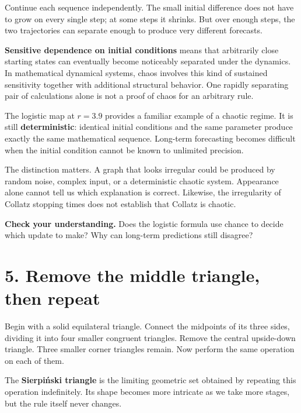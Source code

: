 \documentclass[11pt,letterpaper]{article}
\begin{document}
Continue each sequence independently. The small initial difference does not have to grow on every single step; at some steps it shrinks. But over enough steps, the two trajectories can separate enough to produce very different forecasts.


\textbf{Sensitive dependence on initial conditions} means that arbitrarily close starting states can eventually become noticeably separated under the dynamics. In mathematical dynamical systems, chaos involves this kind of sustained sensitivity together with additional structural behavior. One rapidly separating pair of calculations alone is not a proof of chaos for an arbitrary rule.

The logistic map at \(r=3.9\) provides a familiar example of a chaotic regime. It is still \textbf{deterministic}: identical initial conditions and the same parameter produce exactly the same mathematical sequence. Long-term forecasting becomes difficult when the initial condition cannot be known to unlimited precision.



The distinction matters. A graph that looks irregular could be produced by random noise, complex input, or a deterministic chaotic system. Appearance alone cannot tell us which explanation is correct. Likewise, the irregularity of Collatz stopping times does not establish that Collatz is chaotic.



\begin{tcolorbox}[title={Pause and try 3},breakable]
\textbf{Check your understanding.} Does the logistic formula use chance to decide which update to make? Why can long-term predictions still disagree?
\end{tcolorbox}


\clearpage


\section{5. Remove the middle triangle, then repeat}


Begin with a solid equilateral triangle. Connect the midpoints of its three sides, dividing it into four smaller congruent triangles. Remove the central upside-down triangle. Three smaller corner triangles remain. Now perform the same operation on each of them.



The \textbf{Sierpiński triangle} is the limiting geometric set obtained by repeating this operation indefinitely. Its shape becomes more intricate as we take more stages, but the rule itself never changes.
\end{document}
